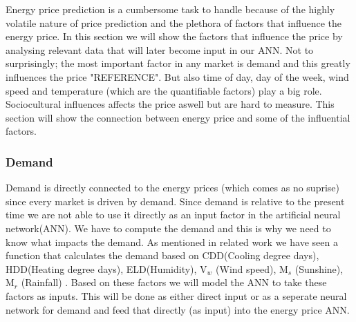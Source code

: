 Energy price prediction is a cumbersome task to handle because of the highly volatile nature of price prediction and the plethora of factors that influence the energy price. In this section we will show the factors that influence the price by analysing relevant data that will later become input in our ANN. Not to surprisingly; the most important factor in any market is demand and this greatly influences the price "REFERENCE". But also time of day, day of the week, wind speed and temperature (which are the quantifiable factors) play a big role. Sociocultural influences affects the price aswell but are hard to measure. This section will show the connection between energy price and some of the influential factors.



\subsubsection{Demand}
Demand is directly connected to the energy prices (which comes as no suprise) since every market is driven by demand. Since demand is relative to the present time we are not able to use it directly as an input factor in the artificial neural network(ANN). We have to compute the demand and this is why we need to know what impacts the demand. As mentioned in related work we have seen a function that calculates the demand based on CDD(Cooling degree days), HDD(Heating degree days), ELD(Humidity), V$_w$ (Wind speed), M$_s$ (Sunshine), M$_r$ (Rainfall) \cite{19}. Based on these factors we will model the ANN to take these factors as inputs. This will be done as either direct input or as a seperate neural network for demand and feed that directly (as input) into the energy price ANN.

